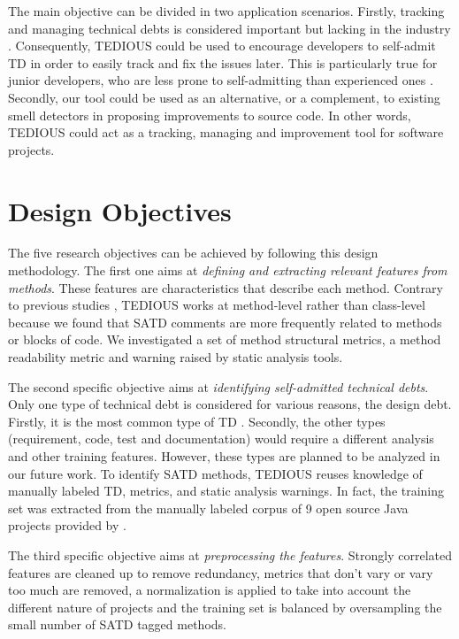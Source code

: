 The main objective can be divided in two application scenarios. Firstly, tracking and managing technical debts is considered important but lacking in the industry \citep{Ernst:2015:MMI:2786805.2786848}. Consequently, \ac{TEDIOUS} could be used to encourage developers to self-admit \ac{TD} in order to easily track and fix the issues later. This is particularly true for junior developers, who are less prone to self-admitting than experienced ones \citep{PotdarS14}. Secondly, our tool could be used as an alternative, or a complement, to existing smell detectors in proposing improvements to source code. In other words, \ac{TEDIOUS} could act as a tracking, managing and improvement tool for software projects. \par

\section{Design Objectives} 

The five research objectives can be achieved by following this design methodology. The first one aims at \emph{defining and extracting relevant features from methods}. These features are characteristics that describe each method. Contrary to previous studies \citep{BavotaR16}, \ac{TEDIOUS} works at method-level rather than class-level because we found that \ac{SATD} comments are more frequently related to methods or blocks of code. We investigated a set of method structural metrics, a method readability metric and warning raised by static analysis tools. \par

The second specific objective aims at \emph{identifying self-admitted technical debts}. Only one type of technical debt is considered for various reasons, the design debt. Firstly, it is the most common type of \ac{TD} \citep{MaldonadoNLP}. Secondly, the other types (requirement, code, test and documentation) would require a different analysis and other training features. However, these types are planned to be analyzed in our future work. To identify SATD methods, TEDIOUS reuses knowledge of manually labeled TD, metrics, and static analysis warnings. In fact, the training set was extracted from the manually labeled corpus of 9 open source Java projects provided by \citet{MaldonadoNLP}.

The third specific objective aims at \emph{preprocessing the features}. Strongly correlated features are cleaned up to remove redundancy, metrics that don't vary or vary too much are removed, a normalization is applied to take into account the different nature of projects and the training set is balanced by oversampling the small number of \ac{SATD} tagged methods. \par

